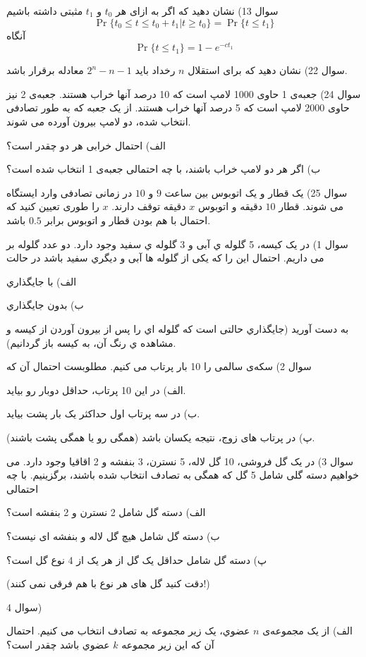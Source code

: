\documentclass[10pt,letterpaper]{article}
\begin{document}
سوال 13) نشان دهید که اگر به ازای هر $t_0$ و $t_1$ مثبتی داشته باشیم
$$
\Pr\{t_0\le t\le t_0+t_1|t\ge t_0\}=\Pr\{t\le t_1\}
$$
آنگاه 
$$
\Pr\{t\le t_1\}=1-e^{-ct_1}
$$

سوال 22) نشان دهید که برای استقلال $n$ رخداد باید 
$2^n-n-1$
 معادله برقرار باشد.

سوال 24) جعبه‌ی 1 حاوی 1000 لامپ است که 10 درصد آنها خراب هستند. جعبه‌ی 2 نیز حاوی 2000 لامپ است که 5 درصد آنها خراب هستند. از یک جعبه که به طور تصادفی انتخاب شده، دو لامپ بیرون آورده می شوند.

الف) احتمال خرابی هر دو چقدر است؟

ب) اگر هر دو لامپ خراب باشند، با چه احتمالی جعبه‌ی 1 انتخاب شده است؟

سوال 25) یک قطار و یک اتوبوس بین ساعت $9$ و $10$ در زمانی تصادفی وارد ایستگاه می شوند. قطار $10$ دقیقه و اتوبوس $x$ دقیقه توقف دارند. $x$ را طوری تعیین کنید که احتمال با هم بودن قطار و اتوبوس برابر $0.5$ باشد.

سوال 1) در یک کیسه، 5 گلوله ي آبی و 3 گلوله ي سفید وجود دارد. دو عدد گلوله بر می داریم. احتمال
این را که یکی از گلوله ها آبی و دیگري سفید باشد در حالت

الف) با جایگذاري

ب) بدون جایگذاري

به دست آورید (جایگذاري حالتی است که گلوله اي را پس از بیرون آوردن از کیسه و مشاهده ي رنگ آن،
به کیسه باز گردانیم).

سوال 2) سکه‌ی سالمی را 10 بار پرتاب می کنیم. مطلوبست احتمال آن که

الف) در این 10 پرتاب، حداقل دوبار رو بیاید.

ب) در سه پرتاب اول حداکثر یک بار پشت بیاید.

پ) در پرتاب های زوج، نتیجه یکسان باشد (همگی رو یا همگی پشت باشند).

سوال 3) در یک گل فروشی، 10 گل لاله، 5 نسترن، 3 بنفشه و 2 اقاقیا وجود دارد. می خواهیم دسته گلی شامل 5 گل که همگی به تصادف انتخاب شده باشند، برگزینیم. با چه احتمالی

الف) دسته گل شامل 2 نسترن و 2 بنفشه است؟

ب) دسته گل شامل هیچ گل لاله و بنفشه ای نیست؟

پ) دسته گل شامل حداقل یک گل از هر یک از 4 نوع گل است؟

(دقت کنید گل های هر نوع با هم فرقی نمی کنند!)

سوال 4)

الف) از یک مجموعه‌ی $n$ عضوي، یک زیر مجموعه به تصادف انتخاب می کنیم. احتمال آن که این زیر مجموعه $k$ عضوي باشد چقدر است؟
\end{document}
